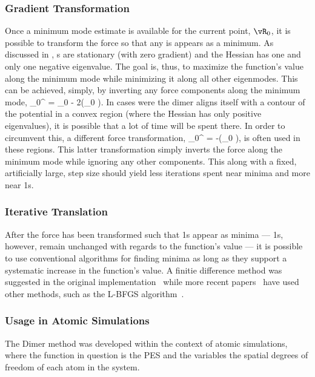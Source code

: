 \subsubsection{Gradient Transformation}
Once a minimum mode estimate is available for the current point, $\vR_0$, it is possible to transform the force so that any  is appears as a minimum.
As discussed in , s are stationary (with zero gradient) and the Hessian has one and only one negative eigenvalue.
The goal is, thus, to maximize the function's value along the minimum mode while minimizing it along all other eigenmodes.
This can be achieved, simply, by inverting any force components along the minimum mode,
\vF_0^ = \vF_0 - 2(\vF_0 \cdot \uvn)\uvn.
\eeq
In cases were the dimer aligns itself with a contour of the potential in a convex region (where the Hessian has only positive eigenvalues), it is possible that a lot of time will be spent there.
In order to circumvent this, a different force transformation,
\vF_0^ = -(\vF_0 \cdot \uvn)\uvn ,
\eeq
is often used in these regions.
This latter transformation simply inverts the force along the minimum mode while ignoring any other components.
This along with a fixed, artificially large, step size should yield less iterations spent near minima and more near \sap1s.~\cite{dimer-original-1999}

\subsubsection{Iterative Translation}
After the force has been transformed such that \sap1s appear as minima --- \sap1s, however, remain unchanged with regards to the function's value --- it is possible to use conventional algorithms for finding minima as long as they support a systematic increase in the function's value.
A finitie difference method was suggested in the original implementation~\cite{dimer-original-1999} while more recent papers~\cite{dimer-kastner-2008} have used other methods, such as the L-BFGS algorithm~\cite{lbfgs}.

\subsubsection{Usage in Atomic Simulations}
The Dimer method was developed within the context of atomic simulations, where the function in question is the PES and the variables the spatial degrees of freedom of each atom in the system.

